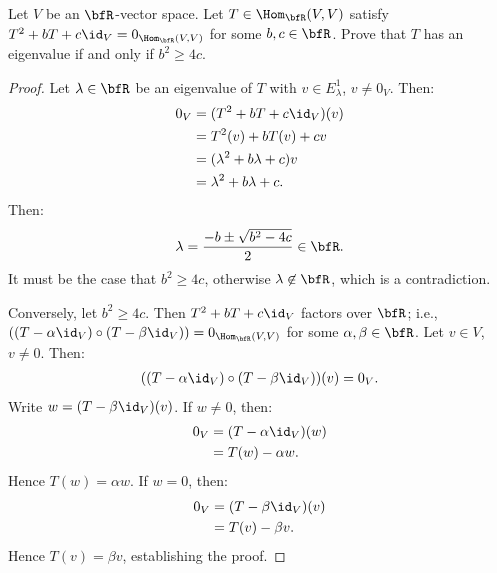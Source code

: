 \documentclass[10pt,twoside,openany]{memoir}
\begin{document}
    \begin{exercise}
        Let $V$ be an $\bfR$-vector space. Let $T \in \Hom_\bfR(V,V)$ satisfy $T^2 + bT + c\id_V = 0_{\Hom_\bfR(V,V)}$ for some $b,c \in \bfR$. Prove that $T$ has an eigenvalue if and only if $b^2 \geq 4c$.
    \end{exercise}
        \begin{proof}
            Let $\lambda \in \bfR$ be an eigenvalue of $T$ with $v \in E_\lambda^1$, $v\neq 0_V$. Then:
                \begin{equation*}
                \begin{split}
                    0_V &= (T^2 +bT + c\id_V)(v) \\
                    & = T^2(v) + bT(v) + cv \\
                    & = (\lambda^2 + b\lambda + c)v \\
                    & = \lambda^2 + b\lambda + c.
                \end{split}
                \end{equation*}
            Then:
                \begin{equation*}
                \begin{split}
                    \lambda = \frac{-b \pm \sqrt{b^2 - 4c}}{2} \in \bfR.
                \end{split}
                \end{equation*}
            It must be the case that $b^2 \geq 4c$, otherwise $\lambda \not\in \bfR$, which is a contradiction.

            Conversely, let $b^2 \geq 4c$. Then $T^2 + bT + c\id_V$ factors over $\bfR$; i.e., $((T - \alpha \id_V)\circ (T - \beta \id_V)) = 0_{\Hom_\bfR(V,V)}$ for some $\alpha,\beta \in \bfR$. Let $v \in V$, $v\neq 0$. Then:
                \begin{equation*}
                \begin{split}
                    ((T-\alpha\id_V)\circ(T-\beta\id_V))(v) = 0_V.
                \end{split}
                \end{equation*}
            Write $w = (T - \beta\id_V)(v)$. If $w \neq 0$, then:
                \begin{equation*}
                \begin{split}
                    0_V &= (T-\alpha\id_V)(w) \\
                    & = T(w) - \alpha w.
                \end{split}
                \end{equation*}
            Hence $T(w) = \alpha w$. If $w = 0$, then:
                \begin{equation*}
                \begin{split}
                    0_V &= (T-\beta\id_V)(v) \\
                    & = T(v) - \beta v.
                \end{split}
                \end{equation*}
            Hence $T(v) = \beta v$, establishing the proof. 
        \end{proof}
\end{document}
